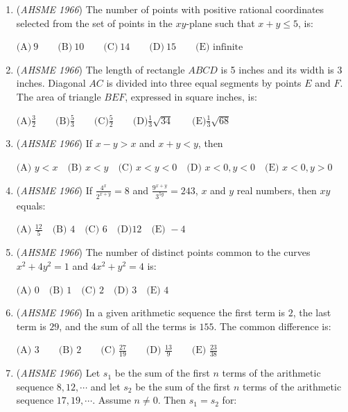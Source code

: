 \begin{enumerate}
	\item (\textit{AHSME 1966}) The number of points with positive rational coordinates selected from the set of points in the $xy$-plane such that $x+y \le 5$, is:


 $\text{(A)} \ 9 \qquad \text{(B)} \ 10 \qquad \text{(C)} \ 14 \qquad \text{(D)} \ 15 \qquad \text{(E) infinite}$


	\item (\textit{AHSME 1966}) The length of rectangle $ABCD$ is 5 inches and its width is 3 inches. Diagonal $AC$ is divided into three equal segments by points $E$ and $F$. The area of triangle $BEF$, expressed in square inches, is:


 $\text{(A)} \frac{3}{2} \qquad \text{(B)} \frac {5}{3} \qquad \text{(C)} \frac{5}{2} \qquad \text{(D)} \frac{1}{3}\sqrt{34} \qquad \text{(E)} \frac{1}{3}\sqrt{68}$


	\item (\textit{AHSME 1966}) If $x-y>x$ and $x+y<y$, then


 $\text{(A) } y<x \quad \text{(B) } x<y \quad \text{(C) } x<y<0 \quad \text{(D) } x<0,y<0 \quad \text{(E) } x<0,y>0$


	\item (\textit{AHSME 1966}) If $\frac{4^x}{2^{x+y}}=8$ and $\frac{9^{x+y}}{3^{5y}}=243$, $x$ and $y$ real numbers, then $xy$ equals:


 $\text{(A) } \frac{12}{5} \quad \text{(B) } 4 \quad \text{(C) } 6 \quad \text{(D)} 12 \quad \text{(E) } -4$


	\item (\textit{AHSME 1966}) The number of distinct points common to the curves $x^2+4y^2=1$ and $4x^2+y^2=4$ is:


 $\text{(A) } 0 \quad \text{(B) } 1 \quad \text{(C) } 2 \quad \text{(D) } 3 \quad \text{(E) } 4$


	\item (\textit{AHSME 1966}) In a given arithmetic sequence the first term is $2$, the last term is $29$, and the sum of all the terms is $155$. The common difference is:


 $\text{(A) } 3 \qquad \text{(B) } 2 \qquad \text{(C) } \frac{27}{19} \qquad \text{(D) } \frac{13}{9} \qquad \text{(E) } \frac{23}{38}$


	\item (\textit{AHSME 1966}) Let $s_1$ be the sum of the first $n$ terms of the arithmetic sequence $8,12,\cdots$ and let $s_2$ be the sum of the first $n$ terms of the arithmetic sequence $17,19,\cdots$. Assume $n \ne 0$. Then $s_1=s_2$ for:



\end{enumerate}
